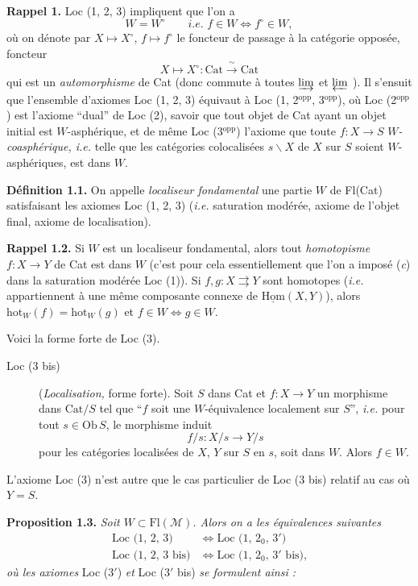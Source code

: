 \documentclass[11pt]{article}
\newcommand{\printedpage}[1]{\marginpar{\footnotesize p.~#1}}
\newcommand{\msp}[1]{\marginpar{\footnotesize [#1]}}
\newcommand{\Cat}{\mathrm{Cat}}
\newcommand{\Ob}{\mathrm{Ob}\,}
\newcommand{\hot}{\mathrm{hot}}
\begin{document}
\textbf{Rappel 1.} Loc (1, 2, 3) impliquent que l’on a
\[
W = W^\circ \qquad \textit{i.e. } f \in W \iff f^\circ \in W,
\]
\printedpage{2}
où on dénote par $X \longmapsto X^\circ$, $f \longmapsto f^\circ$ le foncteur de passage à la catégorie opposée, foncteur
\[
X \longmapsto X^\circ : \Cat \xrightarrow{\ \sim\ } \Cat
\]
qui est un \textit{automorphisme} de Cat (donc commute à toutes $\varinjlim$ et $\varprojlim$ ). Il s’ensuit que l’ensemble d’axiomes Loc (1, 2, 3) équivaut à Loc (1, 2$^{\mathrm{opp}}$, 3$^{\mathrm{opp}}$), où Loc (2$^{\mathrm{opp}}$) est l’axiome “dual” de Loc (2), savoir que tout objet de Cat ayant un objet initial est $W$-asphérique, et de même Loc (3$^{\mathrm{opp}}$) l’axiome que toute $f : X \longrightarrow S$ $W$\textit{-coasphérique, i.e.} telle que les catégories colocalisées $s\backslash X$ de $X$ sur $S$ soient $W$-asphériques, est dans $W$.

\textbf{Définition 1.1.} On appelle \textit{localiseur fondamental} une partie $W$ de Fl(Cat) satisfaisant les axiomes Loc (1, 2, 3) (\textit{i.e.} saturation modérée, axiome de l’objet final, axiome de localisation).

\msp{page 3}

\textbf{Rappel 1.2.} Si $W$ est un localiseur fondamental, alors tout \textit{homotopisme} $f : X \longrightarrow Y$ de Cat est dans $W$ (c’est pour cela essentiellement que l’on a imposé (\textit{c}) dans la saturation modérée Loc (1)). Si $f, g : X \rightrightarrows Y$ sont homotopes (\textit{i.e.} appartiennent à une même composante connexe de $\underline{\mathrm{Hom}}(X, Y)$), alors $\hot_W(f) = \hot_W(g)$ et $f \in W \iff g \in W$.

Voici la forme forte de Loc (3).

\begin{description}
\item[Loc (3 bis)] (\textit{Localisation,} forme forte). Soit $S$ dans Cat et $f : X \longrightarrow Y$ un morphisme dans $\Cat/S$ tel que “$f$ soit une $W$-équivalence localement sur $S$”, \textit{i.e.} pour tout $s \in \Ob S$, le morphisme induit
\[
f/s : X/s \longrightarrow Y/s
\]
pour les catégories localisées de $X$, $Y$ sur $S$ en $s$, soit dans $W$. Alors $f \in W$.
\end{description}

L’axiome Loc (3) n’est autre que le cas particulier de Loc (3 bis) relatif au cas où $Y = S$.

\textbf{Proposition 1.3.} \textit{Soit $W \subset \mathrm{Fl}(\mathcal{M})$. Alors on a les équivalences suivantes}
\[
\begin{aligned}
\text{Loc (1, 2, 3)} &\iff \text{Loc (1, $2_0$, $3'$)}\\
\text{Loc (1, 2, 3 bis)} &\iff \text{Loc (1, $2_0$, $3'$ bis),}
\end{aligned}
\]
\textit{où les axiomes} Loc ($3'$) \textit{et} Loc ($3'$ bis) \textit{se formulent ainsi :}
\end{document}

